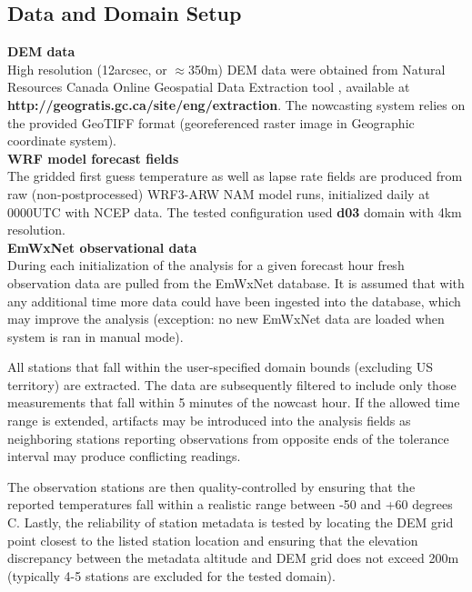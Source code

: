 \documentclass{article}
\begin{document}
\subsection{Data and Domain Setup}

\noindent \textbf{DEM data}\\
High resolution (12arcsec, or $\approx$350m) DEM data were obtained from Natural Resources Canada Online Geospatial Data Extraction tool \cite{DEMdata}, available at \textbf{http://geogratis.gc.ca/site/eng/extraction}. The nowcasting system relies on the provided GeoTIFF format (georeferenced raster image in Geographic coordinate system). \\

\vspace{0.1cm}
\noindent \textbf{WRF model forecast fields}\\
The gridded first guess temperature as well as lapse rate fields are produced from raw (non-postprocessed) WRF3-ARW NAM model runs, initialized daily at 0000UTC with NCEP data. The tested configuration used \textbf{d03} domain with 4km resolution. \\

\vspace{0.1cm}
\noindent \textbf{EmWxNet observational data}\\
During each initialization of the analysis for a given forecast hour fresh observation data are pulled from the EmWxNet database. It is assumed that with any additional time more data could have been ingested into the database, which may improve the analysis (exception: no new EmWxNet data are loaded when system is ran in manual mode). 

All stations that fall within the user-specified domain bounds (excluding US territory) are extracted. The data are subsequently filtered to include only those measurements that fall within 5 minutes of the nowcast hour. If the allowed time range is extended, artifacts may be introduced into the analysis fields as neighboring stations reporting observations from opposite ends of the tolerance interval may produce conflicting readings. 

The observation stations are then quality-controlled by ensuring that the reported temperatures fall within a realistic range between -50 and +60 degrees C. Lastly, the reliability of station metadata is tested by locating the DEM grid point closest to the listed station location and ensuring that the elevation discrepancy between the metadata altitude and DEM grid does not exceed 200m (typically 4-5 stations are excluded for the tested domain). 
\end{document}
